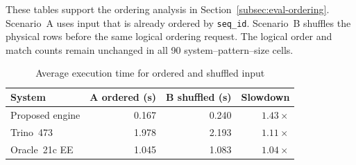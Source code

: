 These tables support the ordering analysis in
Section~\ref{subsec:eval-ordering}.  Scenario~A uses input that is
already ordered by \texttt{seq\_id}.  Scenario~B shuffles the physical
rows before the same logical ordering request.  The logical order and
match counts remain unchanged in all 90
system--pattern--size cells.

\begin{table}[H]
\centering
\caption{Average execution time for ordered and shuffled input}
\label{tab:ordering_scenarios}
\begin{tabular}{lrrr}
\toprule
\textbf{System} & \textbf{A ordered (s)} & \textbf{B shuffled (s)}
  & \textbf{Slowdown} \\
\midrule
Proposed engine & 0.167 & 0.240 & $1.43\times$ \\
Trino~473 & 1.978 & 2.193 & $1.11\times$ \\
Oracle~21c EE & 1.045 & 1.083 & $1.04\times$ \\
\bottomrule
\end{tabular}
\end{table}

{\small
\setlength{\tabcolsep}{4pt}
\begin{table}[H]
\centering
\caption{Execution time and slowdown by size for ordered
  (``ord'') and shuffled (``shuf'') input}
\label{tab:ordering_by_size}
\end{table}
}

